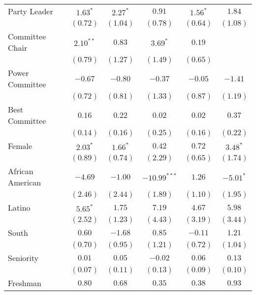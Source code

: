 \documentclass[12pt]{article}
\begin{document}
\begin{table}[H]
\begin{threeparttable}
\begin{tabular}{l c c c c c }
Party Leader          & $1.63^{*}$    & $2.27^{*}$   & $0.91$         & $1.56^{*}$   & $1.84$       \\
                      & $(0.72)$      & $(1.04)$     & $(0.78)$       & $(0.64)$     & $(1.08)$     \\
Committee Chair       & $2.10^{**}$   & $0.83$       & $3.69^{*}$     & $0.19$       &              \\
                      & $(0.79)$      & $(1.27)$     & $(1.49)$       & $(0.65)$     &              \\
Power Committee       & $-0.67$       & $-0.80$      & $-0.37$        & $-0.05$      & $-1.41$      \\
                      & $(0.72)$      & $(0.81)$     & $(1.33)$       & $(0.87)$     & $(1.19)$     \\
Best Committee        & $0.16$        & $0.22$       & $0.02$         & $0.02$       & $0.37$       \\
                      & $(0.14)$      & $(0.16)$     & $(0.25)$       & $(0.16)$     & $(0.22)$     \\
Female                & $2.03^{*}$    & $1.66^{*}$   & $0.42$         & $0.72$       & $3.48^{*}$   \\
                      & $(0.89)$      & $(0.74)$     & $(2.29)$       & $(0.65)$     & $(1.74)$     \\
African American      & $-4.69$       & $-1.00$      & $-10.99^{***}$ & $1.26$       & $-5.01^{*}$  \\
                      & $(2.46)$      & $(2.44)$     & $(1.89)$       & $(1.10)$     & $(1.95)$     \\
Latino                & $5.65^{*}$    & $1.75$       & $7.19$         & $4.67$       & $5.98$       \\
                      & $(2.52)$      & $(1.23)$     & $(4.43)$       & $(3.19)$     & $(3.44)$     \\
South                 & $0.60$        & $-1.68$      & $0.85$         & $-0.11$      & $1.21$       \\
                      & $(0.70)$      & $(0.95)$     & $(1.21)$       & $(0.72)$     & $(1.04)$     \\
Seniority             & $0.01$        & $0.05$       & $-0.02$        & $0.06$       & $0.13$       \\
                      & $(0.07)$      & $(0.11)$     & $(0.13)$       & $(0.09)$     & $(0.10)$     \\
Freshman              & $0.80$        & $0.68$       & $0.35$         & $0.38$       & $0.93$       \\

\end{tabular}
\end{threeparttable}
\end{table}
\end{document}
